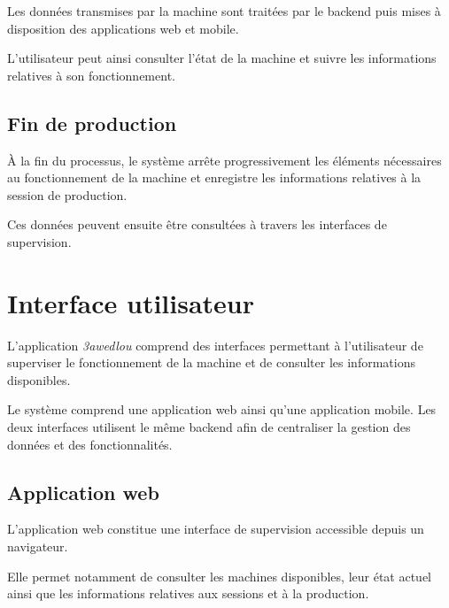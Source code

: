 Les données transmises par la machine sont traitées par le backend puis
mises à disposition des applications web et mobile.

L'utilisateur peut ainsi consulter l'état de la machine et suivre les
informations relatives à son fonctionnement.

\subsection{Fin de production}

À la fin du processus, le système arrête progressivement les éléments
nécessaires au fonctionnement de la machine et enregistre les
informations relatives à la session de production.

Ces données peuvent ensuite être consultées à travers les interfaces de
supervision.

%

\section{Interface utilisateur}

L'application \textit{3awedlou} comprend des interfaces permettant à
l'utilisateur de superviser le fonctionnement de la machine et de
consulter les informations disponibles.

Le système comprend une application web ainsi qu'une application mobile.
Les deux interfaces utilisent le même backend afin de centraliser la
gestion des données et des fonctionnalités.

\subsection{Application web}

L'application web constitue une interface de supervision accessible
depuis un navigateur.

Elle permet notamment de consulter les machines disponibles, leur état
actuel ainsi que les informations relatives aux sessions et à la
production.

%

